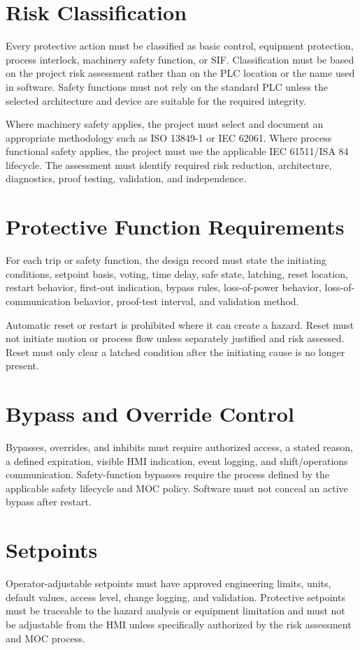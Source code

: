 \section{Risk Classification}
Every protective action must be classified as basic control, equipment protection, process interlock, machinery safety function, or SIF. Classification must be based on the project risk assessment rather than on the PLC location or the name used in software. Safety functions must not rely on the standard PLC unless the selected architecture and device are suitable for the required integrity.

Where machinery safety applies, the project must select and document an appropriate methodology such as ISO 13849-1 or IEC 62061. Where process functional safety applies, the project must use the applicable IEC 61511/ISA 84 lifecycle. The assessment must identify required risk reduction, architecture, diagnostics, proof testing, validation, and independence.

\section{Protective Function Requirements}
For each trip or safety function, the design record must state the initiating conditions, setpoint basis, voting, time delay, safe state, latching, reset location, restart behavior, first-out indication, bypass rules, loss-of-power behavior, loss-of-communication behavior, proof-test interval, and validation method.

Automatic reset or restart is prohibited where it can create a hazard. Reset must not initiate motion or process flow unless separately justified and risk assessed. Reset must only clear a latched condition after the initiating cause is no longer present.

\section{Bypass and Override Control}
Bypasses, overrides, and inhibits must require authorized access, a stated reason, a defined expiration, visible HMI indication, event logging, and shift/operations communication. Safety-function bypasses require the process defined by the applicable safety lifecycle and MOC policy. Software must not conceal an active bypass after restart.

\section{Setpoints}
Operator-adjustable setpoints must have approved engineering limits, units, default values, access level, change logging, and validation. Protective setpoints must be traceable to the hazard analysis or equipment limitation and must not be adjustable from the HMI unless specifically authorized by the risk assessment and MOC process.


